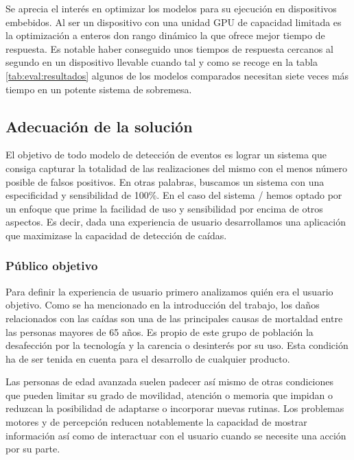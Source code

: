 
      Se aprecia el interés en optimizar los modelos para su ejecución en dispositivos embebidos. Al ser un dispositivo con una unidad GPU de capacidad limitada es la optimización a enteros don rango dinámico la que ofrece mejor tiempo de respuesta. Es notable haber conseguido unos tiempos de respuesta cercanos al segundo en un dispositivo llevable cuando tal y como se recoge en la tabla \ref{tab:eval:resultados} algunos de los modelos comparados necesitan siete veces más tiempo en un potente sistema de sobremesa. 

\subsection{Adecuación de la solución}
El objetivo de todo modelo de detección de eventos es lograr un sistema que consiga capturar la totalidad de las realizaciones del mismo con el menos número posible de falsos positivos. En otras palabras, buscamos un sistema con una especificidad y sensibilidad de 100\%\cite{Noury2007}. En el caso del sistema \ifell/ hemos optado por un enfoque que prime la facilidad de uso y sensibilidad por encima de otros aspectos. Es decir, dada una experiencia de usuario desarrollamos una aplicación que maximizase la capacidad de detección de caídas.

\subsubsection{Público objetivo}
Para definir la experiencia de usuario primero analizamos quién era el usuario objetivo. Como se ha mencionado en la introducción del trabajo, los daños relacionados con las caídas son una de las principales causas de mortaldad entre las personas mayores de 65 años. Es propio de este grupo de población la desafección por la tecnología y la carencia o desinterés por su uso. Esta condición ha de ser tenida en cuenta para el desarrollo de cualquier producto.

Las personas de edad avanzada suelen padecer así mismo de otras condiciones que pueden limitar su grado de movilidad, atención o memoria que impidan o reduzcan la posibilidad de adaptarse o incorporar nuevas rutinas. Los problemas motores y de percepción reducen notablemente la capacidad de mostrar información así como de interactuar con el usuario cuando se necesite una acción por su parte.

